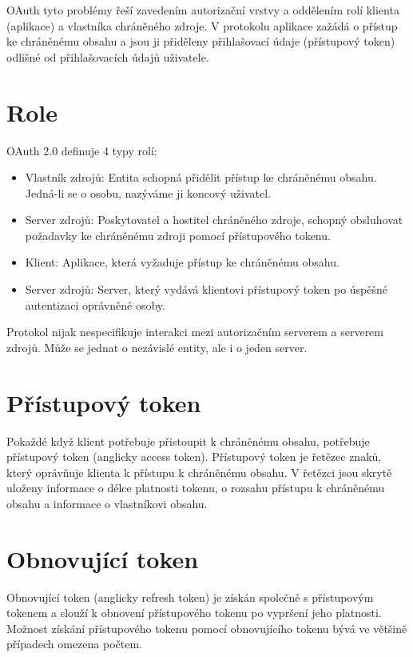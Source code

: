 \documentclass[]{fithesis3}
\begin{document}
	OAuth tyto problémy řeší zavedením autorizační vrstvy a oddělením rolí klienta 					(aplikace) a vlastníka chráněného zdroje. V protokolu aplikace zažádá o přístup ke 				chráněnému obsahu  a jsou ji přiděleny přihlašovací údaje (přístupový token) odlišné od 			přihlašovacích údajů uživatele. 

	\section{Role}
		OAuth 2.0 definuje 4 typy rolí:

		\begin{itemize}
 		\item Vlastník zdrojů:
  		\newline
		Entita schopná přidělit přístup ke chráněnému obsahu. Jedná-li se o osobu, nazýváme ji 			koncový uživatel.
  		\item Server zdrojů:
  		\newline
		Poskytovatel a hostitel chráněného zdroje, schopný obsluhovat požadavky ke 					chráněnému zdroji pomocí přístupového tokenu.
 	 	\item Klient:
  		\newline
		Aplikace, která vyžaduje přístup ke chráněnému obsahu.
  		\item Server zdrojů:
 		\newline
		Server, který vydává klientovi přístupový token po úspěšné autentizaci oprávněné osoby.
		\end{itemize}
		Protokol nijak nespecifikuje interakci mezi autorizačním serverem a serverem zdrojů. 				Může se jednat o nezávislé entity, ale i o jeden server.

	\section{Přístupový token}	

	Pokaždé když klient potřebuje přistoupit k chráněnému obsahu, potřebuje přístupový token 			(anglicky access token). Přístupový token je řetězec znaků, který oprávňuje klienta k přístupu 		k chráněnému obsahu. V řetězci jsou skrytě uloženy informace o délce platnosti tokenu, o 			rozsahu přístupu k 	chráněnému obsahu a informace o vlastníkovi obsahu.

	\section{Obnovující token}	

	Obnovující token (anglicky refresh token) je získán společně s přístupovým tokenem a slouží k 		obnovení přístupového tokenu po vypršení jeho platnosti. Možnost získání přístupového 			tokenu pomocí obnovujícího tokenu bývá ve většině případech omezena počtem. 
\end{document}
